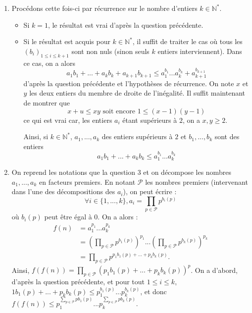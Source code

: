 \documentclass[10pt,a4paper]{article}
\begin{document}
\begin{enumerate}
\begin{enumerate}
\begin{itemize}
\end{itemize}
\item Procédons cette fois-ci par récurrence sur le nombre d'entiers $k\in\mathbb{N}^*$.
\begin{itemize}
\item Si $k=1$, le résultat est vrai d'après la question précédente.
\item Si le résultat est acquis pour $k\in\mathbb{N}^*$, il suffit de traiter le cas où tous les $(b_i)_{1\leqslant i\leqslant k+1}$ sont non nuls (sinon seuls $k$ 
entiers interviennent). Dans ce cas, on a alors 
$$a_1b_1+...+a_kb_k+a_{k+1}b_{k+1}\leqslant a_1^{b_1}...a_k^{b_k}+a_{k+1}^{b_{k+1}}$$
d'après la question précédente et l'hypothèses de récurrence. On note $x$ et $y$ les deux entiers du membre de droite de l'inégalité. Il suffit maintenant de 
montrer que 
$$x+u\leqslant xy \text{ soit encore } 1\leqslant (x-1)(y-1)$$
ce qui est vrai car, les entiers $a_i$ étant supérieurs à $2$, on a $x,y\geqslant 2$.

Ainsi, si $k\in\mathbb{N}^*$, $a_1,...,a_k$ des entiers supérieurs à $2$ et $b_1,...,b_k$ sont des entiers
$$\boxed{a_1b_1+...+a_kb_k\leqslant a_1^{b_1}...a_k^{b_k}}$$

\end{itemize}
\item On reprend les notations que la question $3$ et on décompose les nombres $a_1,...,a_k$ en facteurs premiers. En notant $\mathcal{P}$ les nombres premiers 
(intervenant dans l'une des décompositions des $a_i$), on peut écrire :
$$\forall i\in\{1,...,k\}, a_i=\prod\limits_{p\in \mathcal{P}}p^{b_i(p)}$$
où $b_i(p)$ peut être égal à $0$. On a alors :
$$\begin{array}{rl}
f(n)&=a_1^{p_1}...a_k^{p_k}\\
 &=(\prod\limits_{p\in \mathcal{P}}p^{b_1(p)})^{p_1}...(\prod\limits_{p\in \mathcal{P}}p^{b_k(p)})^{p_k}\\
 &= \prod\limits_{p\in\mathcal{P}}p^{p_1b_1(p)+...+p_kb_k(p)}.
\end{array}$$
Ainsi, $f(f(n))=\prod\limits_{p\in\mathcal{P}}(p_1b_1(p)+...+p_kb_k(p))^p$. On a d'abord, d'après la question précédente, et pour tout $1\leqslant i \leqslant k$,
$1b_1(p)+...+p_kb_k(p)\leqslant p_1^{b_1(p)}...p_k^{b_k(p)}$, et donc $f(f(n))\leqslant p_1^{\sum\limits_{p\in\mathcal{P}}pb_1(p)}...p_k^{\sum\limits_{p\in\mathcal{P}}pb_k(p)}.$


\end{enumerate}
\end{enumerate}
\end{document}
